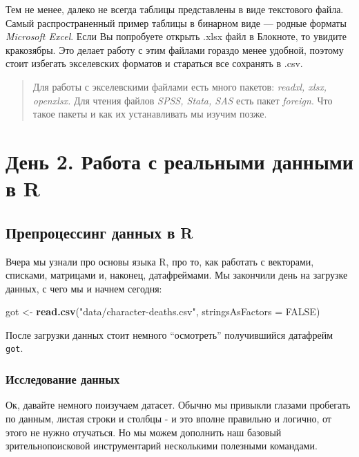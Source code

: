 \documentclass[]{book}
\newenvironment{Shaded}{\begin{snugshade}}{\end{snugshade}}
\newcommand{\KeywordTok}[1]{\textcolor[rgb]{0.13,0.29,0.53}{\textbf{#1}}}
\newcommand{\DataTypeTok}[1]{\textcolor[rgb]{0.13,0.29,0.53}{#1}}
\newcommand{\StringTok}[1]{\textcolor[rgb]{0.31,0.60,0.02}{#1}}
\newcommand{\OtherTok}[1]{\textcolor[rgb]{0.56,0.35,0.01}{#1}}
\newcommand{\NormalTok}[1]{#1}
\begin{document}
Тем не менее, далеко не всегда таблицы представлены в виде текстового
файла. Самый распространенный пример таблицы в бинарном виде --- родные
форматы \emph{Microsoft Excel}. Если Вы попробуете открыть .xlsx файл в
Блокноте, то увидите кракозябры. Это делает работу с этим файлами
гораздо менее удобной, поэтому стоит избегать экселевских форматов и
стараться все сохранять в .csv.

\begin{quote}
Для работы с экселевскими файлами есть много пакетов: \emph{readxl,
xlsx, openxlsx.} Для чтения файлов \emph{SPSS, Stata, SAS} есть пакет
\emph{foreign}. Что такое пакеты и как их устанавливать мы изучим позже.
\end{quote}

\chapter{День 2. Работа с реальными данными в R}\label{real}

\section{Препроцессинг данных в R}\label{prep}

Вчера мы узнали про основы языка R, про то, как работать с векторами,
списками, матрицами и, наконец, датафреймами. Мы закончили день на
загрузке данных, с чего мы и начнем сегодня:

\begin{Shaded}
\begin{Highlighting}[]
\NormalTok{got <-}\StringTok{ }\KeywordTok{read.csv}\NormalTok{(}\StringTok{"data/character-deaths.csv"}\NormalTok{, }\DataTypeTok{stringsAsFactors =} \OtherTok{FALSE}\NormalTok{)}
\end{Highlighting}
\end{Shaded}

После загрузки данных стоит немного ``осмотреть'' получившийся датафрейм
\texttt{got}.

\subsection{Исследование данных}\label{explore}

Ок, давайте немного поизучаем датасет. Обычно мы привыкли глазами
пробегать по данным, листая строки и столбцы - и это вполне правильно и
логично, от этого не нужно отучаться. Но мы можем дополнить наш базовый
зрительнопоисковой инструментарий несколькими полезными командами.
\end{document}

